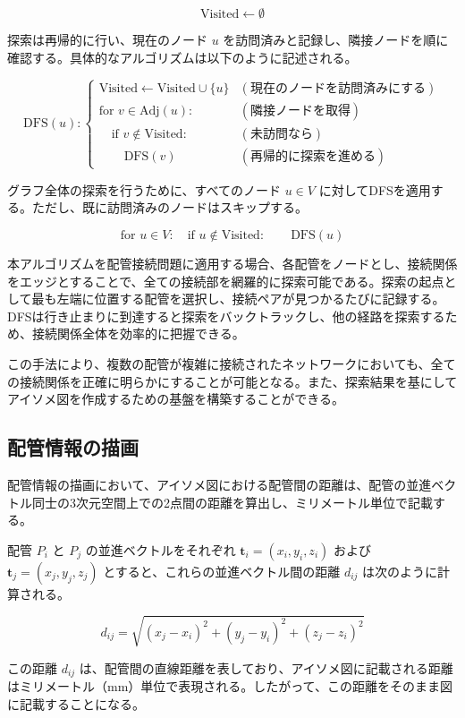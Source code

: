 \[
\text{Visited} \gets \emptyset
\]

探索は再帰的に行い、現在のノード $u$ を訪問済みと記録し、隣接ノードを順に確認する。具体的なアルゴリズムは以下のように記述される。

\[
\text{DFS}(u):
\begin{cases}
  \text{Visited} \gets \text{Visited} \cup \{ u \} & (\text{現在のノードを訪問済みにする}) \\
  \text{for } v \in \text{Adj}(u): & (\text{隣接ノードを取得}) \\
  \quad \text{if } v \notin \text{Visited}: & (\text{未訪問なら}) \\
  \quad\quad \text{DFS}(v) & (\text{再帰的に探索を進める})
\end{cases}
\]

グラフ全体の探索を行うために、すべてのノード $u \in V$ に対してDFSを適用する。ただし、既に訪問済みのノードはスキップする。

\[
\text{for } u \in V:
\quad \text{if } u \notin \text{Visited}:
\quad\quad \text{DFS}(u)
\]

本アルゴリズムを配管接続問題に適用する場合、各配管をノードとし、接続関係をエッジとすることで、全ての接続部を網羅的に探索可能である。探索の起点として最も左端に位置する配管を選択し、接続ペアが見つかるたびに記録する。DFSは行き止まりに到達すると探索をバックトラックし、他の経路を探索するため、接続関係全体を効率的に把握できる。

この手法により、複数の配管が複雑に接続されたネットワークにおいても、全ての接続関係を正確に明らかにすることが可能となる。また、探索結果を基にしてアイソメ図を作成するための基盤を構築することができる。



\subsection{配管情報の描画}
配管情報の描画において、アイソメ図における配管間の距離は、配管の並進ベクトル同士の3次元空間上での2点間の距離を算出し、ミリメートル単位で記載する。

配管 \( P_i \) と \( P_j \) の並進ベクトルをそれぞれ \( \mathbf{t}_i = (x_i, y_i, z_i) \) および \( \mathbf{t}_j = (x_j, y_j, z_j) \) とすると、これらの並進ベクトル間の距離 \( d_{ij} \) は次のように計算される。

\[
d_{ij} = \sqrt{(x_j - x_i)^2 + (y_j - y_i)^2 + (z_j - z_i)^2}
\]

この距離 \( d_{ij} \) は、配管間の直線距離を表しており、アイソメ図に記載される距離はミリメートル（mm）単位で表現される。したがって、この距離をそのまま図に記載することになる。

